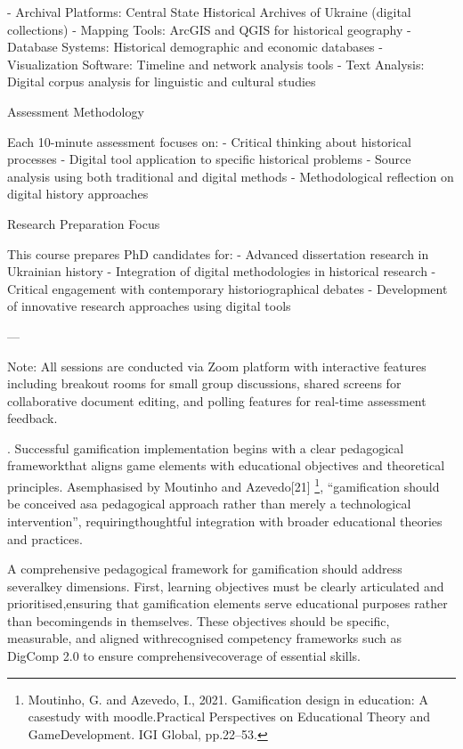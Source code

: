 -  Archival Platforms:  Central State Historical Archives of Ukraine (digital collections)
-  Mapping Tools:  ArcGIS and QGIS for historical geography
-  Database Systems:  Historical demographic and economic databases
-  Visualization Software:  Timeline and network analysis tools
-  Text Analysis:  Digital corpus analysis for linguistic and cultural studies

   Assessment Methodology 

Each 10-minute assessment focuses on:
-  Critical thinking  about historical processes
-  Digital tool application  to specific historical problems
-  Source analysis  using both traditional and digital methods
-  Methodological reflection  on digital history approaches

   Research Preparation Focus 

This course prepares PhD candidates for:
- Advanced dissertation research in Ukrainian history
- Integration of digital methodologies in historical research
- Critical engagement with contemporary historiographical debates
- Development of innovative research approaches using digital tools

---

 Note:  All sessions are conducted via Zoom platform with interactive features including breakout rooms for small group discussions, shared screens for collaborative document editing, and polling features for real-time assessment feedback.

\cite{Titova_Korniienko}. 
Successful gamification implementation begins with a clear pedagogical frameworkthat aligns game elements with educational objectives and theoretical principles. Asemphasised by Moutinho and Azevedo[21] \footnote{Moutinho, G. and Azevedo, I., 2021. Gamification design in education: A casestudy  with  moodle.Practical  Perspectives  on  Educational  Theory  and  GameDevelopment.  IGI Global, pp.22–53.}, “gamification should be conceived asa pedagogical approach rather than merely a technological intervention”, requiringthoughtful integration with broader educational theories and practices.

A comprehensive pedagogical framework for gamification should address severalkey dimensions. First, learning objectives must be clearly articulated and prioritised,ensuring that gamification elements serve educational purposes rather than becomingends in themselves. These objectives should be specific, measurable, and aligned withrecognised competency frameworks such as DigComp 2.0 to ensure comprehensivecoverage of essential skills.

